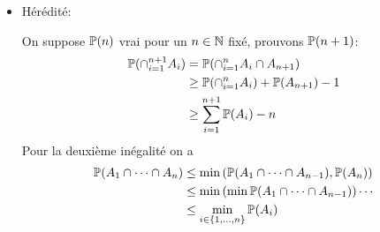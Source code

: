 {\begin{td-sol}[]
\begin{enumerate}
\begin{itemize}[label=\(\triangleright\)]
                \item Hérédité:

                On suppose \(\mathbb{P}(n)\) vrai pour un \(n\in\mathbb{N}\) fixé, prouvons \(\mathbb{P}(n+1)\):
                \begin{equation*}
                    \begin{aligned}
                        \mathbb{P}(\cap_{i=1}^{n+1} A_i)
                        &= \mathbb{P}(\cap_{i=1}^n A_i\cap A_{n+1})\\
                        &\geq \mathbb{P}(\cap_{i=1}^n A_i) + \mathbb{P}(A_{n+1}) -1\\
                        &\geq \sum_{i=1}^{n+1} \mathbb{P}(A_i) - n
                    \end{aligned}
                \end{equation*}
                Pour la deuxième inégalité on a
                \begin{equation*}
                    \begin{aligned}
                        \mathbb{P}(A_1\cap\cdots\cap A_n)
                        &\le \min\left(\mathbb{P}(A_1\cap\cdots\cap A_{n-1}), \mathbb{P}(A_n)\right)\\
                        &\le \min\left(\min \mathbb{P}(A_1\cap\cdots\cap A_{n-1})\right)\cdots\\
                        &\le \min_{i\in\{1,\dots,n\}} \mathbb{P}(A_i)
                    \end{aligned}
                \end{equation*}
            \end{itemize}
        \end{enumerate}
    \end{td-sol}
}{}